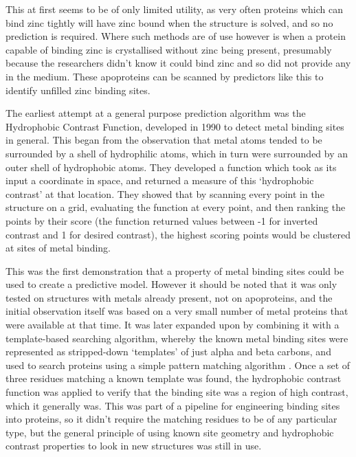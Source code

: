 This at first seems to be of only limited utility, as very often proteins which can bind zinc tightly will have zinc bound when the structure is solved, and so no prediction is required. Where such methods are of use however is when a protein capable of binding zinc is crystallised without zinc being present, presumably because the researchers didn't know it could bind zinc and so did not provide any in the medium. These apoproteins can be scanned by predictors like this to identify unfilled zinc binding sites.

The earliest attempt at a general purpose prediction algorithm was the Hydrophobic Contrast Function, developed in 1990 \cite{yamashita1990metal} to detect metal binding sites in general. This began from the observation that metal atoms tended to be surrounded by a shell of hydrophilic atoms, which in turn were surrounded by an outer shell of hydrophobic atoms. They developed a function which took as its input a coordinate in space, and returned a measure of this `hydrophobic contrast' at that location. They showed that by scanning every point in the structure on a grid, evaluating the function at every point, and then ranking the points by their score (the function returned values between -1 for inverted contrast and 1 for desired contrast), the highest scoring points would be clustered at sites of metal binding.

This was the first demonstration that a property of metal binding sites could be used to create a predictive model. However it should be noted that it was only tested on structures with metals already present, not on apoproteins, and the initial observation itself was based on a very small number of metal proteins that were available at that time. It was later expanded upon by combining it with a template-based searching algorithm, whereby the known metal binding sites were represented as stripped-down `templates' of just alpha and beta carbons, and used to search proteins using a simple pattern matching algorithm \cite{gregory1993prediction}. Once a set of three residues matching a known template was found, the hydrophobic contrast function was applied to verify that the binding site was a region of high contrast, which it generally was. This was part of a pipeline for engineering binding sites into proteins, so it didn't require the matching residues to be of any particular type, but the general principle of using known site geometry and hydrophobic contrast properties to look in new structures was still in use.

